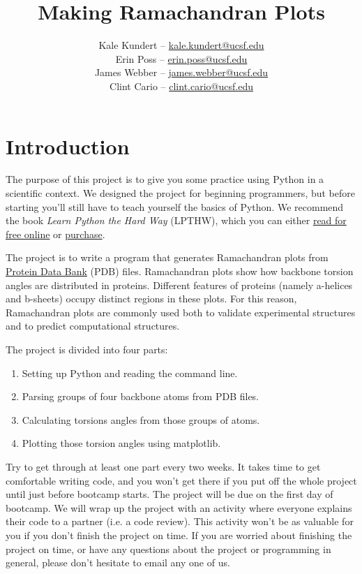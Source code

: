 \documentclass{article}
\newcommand{\ahelices}{\textgreek{a}-helices}
\newcommand{\bsheets}{\textgreek{b}-sheets}
\begin{document}
\title{Making Ramachandran Plots}
\author{
 Kale Kundert -- \href{mailto:kale.kundert@ucsf.edu}{kale.kundert@ucsf.edu} \\
 Erin Poss -- \href{mailto:erin.poss@ucsf.edu}{erin.poss@ucsf.edu} \\
 James Webber -- \href{mailto:james.webber@ucsf.edu}{james.webber@ucsf.edu} \\
 Clint Cario -- \href{mailto:clint.cario@ucsf.edu}{clint.cario@ucsf.edu} \\
}
\date{}
\maketitle{}

\section{Introduction}

The purpose of this project is to give you some practice using Python in a 
scientific context.  We designed the project for beginning programmers, but 
before starting you'll still have to teach yourself the basics of Python.  We 
recommend the book \emph{Learn Python the Hard Way} (LPTHW), which you can 
either \href{http://learnpythonthehardway.org/book/}{read for free online} or 
\href{https://paydiv.io/access/buy/2/}{purchase}.

The project is to write a program that generates Ramachandran plots from 
\href{http://www.rcsb.org/pdb/home/home.do}{Protein Data Bank} (PDB) files.  
Ramachandran plots show how backbone torsion angles are distributed in 
proteins.  Different features of proteins (namely \ahelices{} and \bsheets{}) 
occupy distinct regions in these plots.  For this reason, Ramachandran plots 
are commonly used both to validate experimental structures and to predict 
computational structures.

The project is divided into four parts:

\begin{enumerate}
 \item Setting up Python and reading the command line.
 \item Parsing groups of four backbone atoms from PDB files.
 \item Calculating torsions angles from those groups of atoms.
 \item Plotting those torsion angles using matplotlib.
\end{enumerate}

Try to get through at least one part every two weeks.  It takes time to get 
comfortable writing code, and you won't get there if you put off the whole 
project until just before bootcamp starts.  The project will be due on the 
first day of bootcamp.  We will wrap up the project with an activity where 
everyone explains their code to a partner (i.e. a code review).  This activity 
won't be as valuable for you if you don't finish the project on time.  If you 
are worried about finishing the project on time, or have any questions about 
the project or programming in general, please don't hesitate to email any one 
of us.
\end{document}
